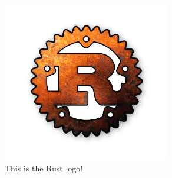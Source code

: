\documentclass[a4paper,11pt]{article}
\date{}
\begin{document}
\begin{figure}
	\includegraphics[scale=1]{rust_logo.jpg}
	\caption{This is the Rust logo!}
\end{figure}
\end{document}
